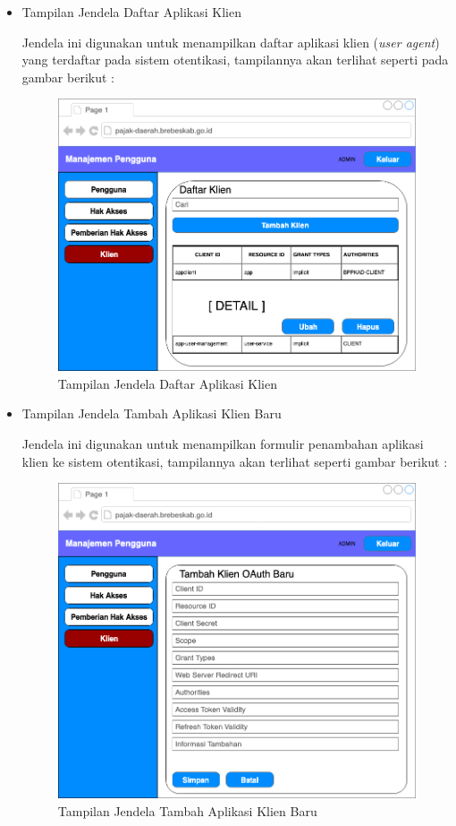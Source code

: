 \documentclass[pdftex,12pt, oneside]{article}
\begin{document}
\begin{itemize}
	\item Tampilan Jendela Daftar Aplikasi Klien
	
	Jendela ini digunakan untuk menampilkan daftar aplikasi klien (\textit{user agent}) yang terdaftar pada sistem otentikasi, tampilannya akan terlihat seperti pada gambar berikut :
	
	\begin{figure}[H]
		\centering
		\includegraphics[width=1\textwidth]{./resources/list-client-ui}
		\caption{ Tampilan Jendela Daftar Aplikasi Klien}
		\label{fig:list-client-ui}
	\end{figure}
	
	\item Tampilan Jendela Tambah Aplikasi Klien Baru
	
	Jendela ini digunakan untuk menampilkan formulir penambahan aplikasi klien ke sistem otentikasi, tampilannya akan terlihat seperti gambar berikut :
	
	\begin{figure}[H]
		\centering
		\includegraphics[width=1\textwidth]{./resources/add-client-ui}
		\caption{Tampilan Jendela Tambah Aplikasi Klien Baru}
		\label{fig:add-client-ui}
	\end{figure}
	

\end{itemize}
\end{document}
